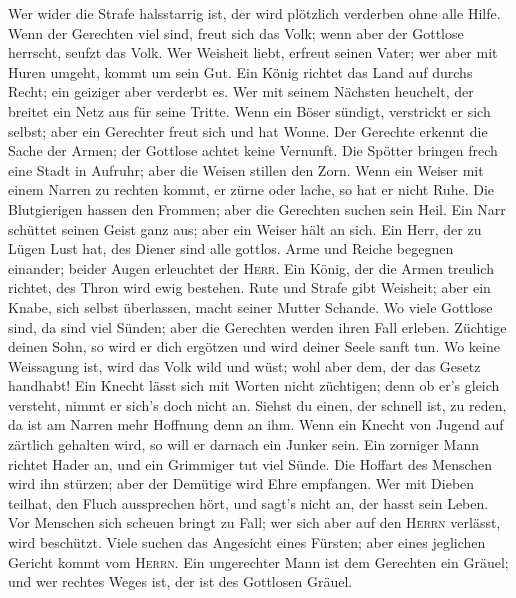  Wer wider die Strafe halsstarrig ist, der wird plötzlich
verderben ohne alle Hilfe.  Wenn der Gerechten viel sind,
freut sich das Volk; wenn aber der Gottlose herrscht, seufzt das Volk.
 Wer Weisheit liebt, erfreut seinen Vater; wer aber mit
Huren umgeht, kommt um sein Gut.  Ein König richtet das
Land auf durchs Recht; ein geiziger aber verderbt es.  Wer
mit seinem Nächsten heuchelt, der breitet ein Netz aus für seine Tritte.
 Wenn ein Böser sündigt, verstrickt er sich selbst; aber
ein Gerechter freut sich und hat Wonne.  Der Gerechte
erkennt die Sache der Armen; der Gottlose achtet keine Vernunft.
 Die Spötter bringen frech eine Stadt in Aufruhr; aber die
Weisen stillen den Zorn.  Wenn ein Weiser mit einem Narren
zu rechten kommt, er zürne oder lache, so hat er nicht Ruhe.
 Die Blutgierigen hassen den Frommen; aber die Gerechten
suchen sein Heil.  Ein Narr schüttet seinen Geist ganz
aus; aber ein Weiser hält an sich.  Ein Herr, der zu
Lügen Lust hat, des Diener sind alle gottlos.  Arme und
Reiche begegnen einander; beider Augen erleuchtet der \textsc{Herr}.
 Ein König, der die Armen treulich richtet, des Thron
wird ewig bestehen.  Rute und Strafe gibt Weisheit; aber
ein Knabe, sich selbst überlassen, macht seiner Mutter Schande.
 Wo viele Gottlose sind, da sind viel Sünden; aber die
Gerechten werden ihren Fall erleben.  Züchtige deinen
Sohn, so wird er dich ergötzen und wird deiner Seele sanft tun.
 Wo keine Weissagung ist, wird das Volk wild und wüst;
wohl aber dem, der das Gesetz handhabt!  Ein Knecht lässt
sich mit Worten nicht züchtigen; denn ob er's gleich versteht, nimmt er
sich's doch nicht an.  Siehst du einen, der schnell ist,
zu reden, da ist am Narren mehr Hoffnung denn an ihm. 
Wenn ein Knecht von Jugend auf zärtlich gehalten wird, so will er
darnach ein Junker sein.  Ein zorniger Mann richtet Hader
an, und ein Grimmiger tut viel Sünde.  Die Hoffart des
Menschen wird ihn stürzen; aber der Demütige wird Ehre empfangen.
 Wer mit Dieben teilhat, den Fluch aussprechen hört, und
sagt's nicht an, der hasst sein Leben.  Vor Menschen sich
scheuen bringt zu Fall; wer sich aber auf den \textsc{Herrn} verlässt,
wird beschützt.  Viele suchen das Angesicht eines
Fürsten; aber eines jeglichen Gericht kommt vom \textsc{Herrn}.
 Ein ungerechter Mann ist dem Gerechten ein Gräuel; und
wer rechtes Weges ist, der ist des Gottlosen Gräuel.

